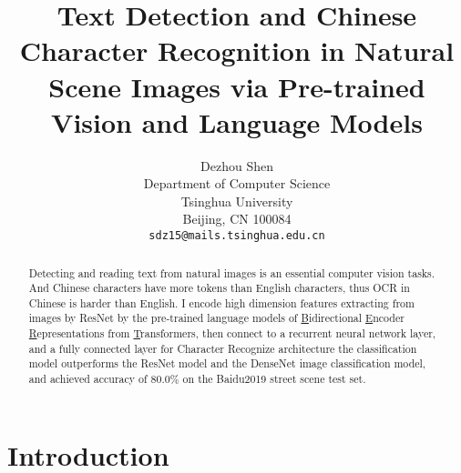 \documentclass[review]{cvpr}
\begin{document}
\title{Text Detection and Chinese Character Recognition in Natural Scene Images via Pre-trained Vision and Language Models}

\author{Dezhou Shen\\
Department of Computer Science\\
Tsinghua University\\
Beijing, CN 100084\\
{\tt\small sdz15@mails.tsinghua.edu.cn}
}

\maketitle


\begin{abstract}

  Detecting and reading text from natural images is an essential computer vision tasks.
  And Chinese characters have more tokens than English characters, thus OCR in Chinese is harder than English.
  I encode high dimension features extracting from images by ResNet by the pre-trained language models of
  \underline{B}idirectional \underline{E}ncoder \underline{R}epresentations from \underline{T}ransformers,
  then connect to a recurrent neural network layer, and a fully connected layer for Character Recognize architecture
  the classification model outperforms the ResNet model and the DenseNet image classification model,
  and achieved accuracy of $80.0\%$ on the Baidu2019 street scene test set.

\end{abstract}

\section{Introduction}
\end{document}
